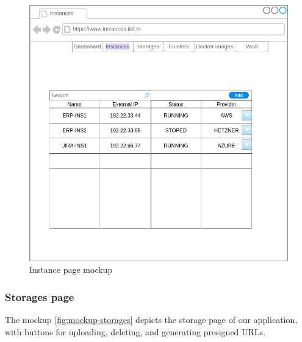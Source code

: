 \begin{figure}[h]
  \center
  \includegraphics[width=13cm]{mockup-instances.png}
  \caption{Instance page mockup}
  \label{fig:mockup-instances}
\end{figure}

\subsubsection{Storages page}

The mockup \hyperref[fig:mockup-storages]{\ref{fig:mockup-storages}} depicts the storage page of our application, with buttons for uploading, deleting, and generating presigned URLs.

